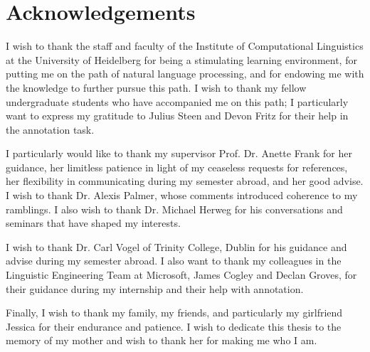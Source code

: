 


\bigskip


\begingroup

\let\clearpage\relax
\let\cleardoublepage\relax
\let\cleardoublepage\relax

\chapter*{Acknowledgements} %

I wish to thank the staff and faculty of the Institute of Computational Linguistics at the University of Heidelberg for being a stimulating learning environment, for putting me on the path of natural language processing, and for endowing me with the knowledge to further pursue this path. I wish to thank my fellow undergraduate students who have accompanied me on this path; I particularly want to express my gratitude to Julius Steen and Devon Fritz for their help in the annotation task.

I particularly would like to thank my supervisor Prof. Dr. Anette Frank for her guidance, her limitless patience in light of my ceaseless requests for references, her flexibility in communicating during my semester abroad, and her good advise. I wish to thank Dr. Alexis Palmer, whose comments introduced coherence to my ramblings. I also wish to thank Dr. Michael Herweg for his conversations and seminars that have shaped my interests. 

I wish to thank Dr. Carl Vogel of Trinity College, Dublin for his guidance and advise during my semester abroad. I also want to thank my colleagues in the Linguistic Engineering Team at Microsoft, James Cogley and Declan Groves, for their guidance during my internship and their help with annotation.

Finally, I wish to thank my family, my friends, and particularly my girlfriend Jessica for their endurance and patience. I wish to dedicate this thesis to the memory of my mother and wish to thank her for making me who I am.

\endgroup